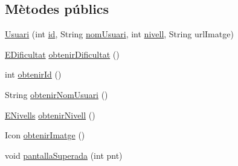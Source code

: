 \subsection*{Mètodes públics}
\begin{DoxyCompactItemize}
\item 
\hyperlink{classlogica_1_1_usuari_a7d61fbf17076f5c75841d30598ee3289}{Usuari} (int \hyperlink{classlogica_1_1_usuari_a03e97d4f96974eabebd5b15c95267cdf}{id}, String \hyperlink{classlogica_1_1_usuari_a786e8efb6a09a1cc3678d4103606319a}{nom\+Usuari}, int \hyperlink{classlogica_1_1_usuari_af876e9fe1520077525154738abadc8ef}{nivell}, String url\+Imatge)
\item 
\hyperlink{enumlogica_1_1_usuari_1_1_e_dificultat}{E\+Dificultat} \hyperlink{classlogica_1_1_usuari_a8aaddefb9f6dba6e142426483ade785f}{obtenir\+Dificultat} ()
\item 
int \hyperlink{classlogica_1_1_usuari_a47de68f8f3a0a5c45352b0f93cb0d156}{obtenir\+Id} ()
\item 
String \hyperlink{classlogica_1_1_usuari_a642304fd209679e1cd3f312eaa06ed9c}{obtenir\+Nom\+Usuari} ()
\item 
\hyperlink{enumlogica_1_1_usuari_1_1_e_nivells}{E\+Nivells} \hyperlink{classlogica_1_1_usuari_a1af8cdd311f23f556295912d869c1630}{obtenir\+Nivell} ()
\item 
Icon \hyperlink{classlogica_1_1_usuari_aa1f96063a4d6a068e2088e6f7339a4fa}{obtenir\+Imatge} ()
\item 
void \hyperlink{classlogica_1_1_usuari_a3d2c12a1138df467863c3ff43827bed1}{pantalla\+Superada} (int pnt)
\end{DoxyCompactItemize}
